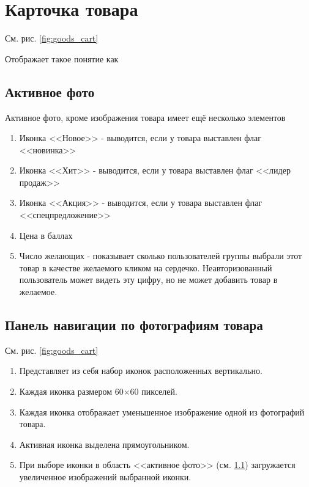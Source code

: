     \section{Карточка товара}
        \label{sec:goods_cart}
        См. рис. \ref{fig:goods_cart}
       
        Отображает такое понятие как 

        \subsection{Активное фото}
            \label{sec:noauth_active_photo}
            Активное фото, кроме изображения товара имеет ещё несколько элементов
            
            \begin{enumerate}
                \item Иконка <<Новое>> - выводится, если у товара выставлен флаг <<новинка>>
                \item Иконка <<Хит>> - выводится, если у товара выставлен флаг <<лидер продаж>>
                \item Иконка <<Акция>> - выводится, если у товара выставлен флаг <<спецпредложение>>
                \item Цена в баллах 
                \item Число желающих - показывает сколько пользователей группы 
                     выбрали этот товар в качестве желаемого 
                    кликом на сердечко. Неавторизованный пользователь может видеть
                    эту цифру, но не может добавить товар в желаемое.
            \end{enumerate}


        \subsection{Панель навигации по фотографиям товара}
            См. рис. \ref{fig:goods_cart}
            
            \begin{enumerate}
                \item Представляет из себя набор иконок расположенных вертикально.
                \item Каждая иконка размером 60$\times$60 пикселей.
                \item Каждая иконка отображает уменьшенное изображение одной из фотографий товара.
                \item Активная иконка выделена прямоугольником.
                \item При выборе иконки в область <<активное фото>> (см. \ref{sec:noauth_active_photo}) 
                    загружается увеличенное изображений выбранной иконки.
            \end{enumerate}
            
